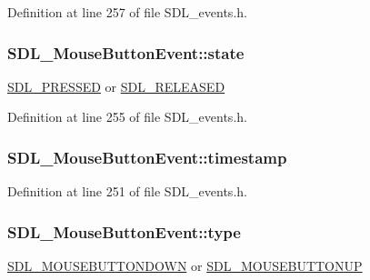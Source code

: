 Definition at line 257 of file S\-D\-L\-\_\-events.\-h.

\hypertarget{struct_s_d_l___mouse_button_event_a8809cef85cfffad4f2059f2ba4fc6a3d}{
\subsubsection[{state}]{ S\-D\-L\-\_\-\-Mouse\-Button\-Event\-::state}}\label{struct_s_d_l___mouse_button_event_a8809cef85cfffad4f2059f2ba4fc6a3d}
\hyperlink{_s_d_l__events_8h_aee81bbffbc8489bdea8fecd1232c4bd1}{S\-D\-L\-\_\-\-P\-R\-E\-S\-S\-E\-D} or \hyperlink{_s_d_l__events_8h_ad680a069f9fcab80de91b3eefdf29c3c}{S\-D\-L\-\_\-\-R\-E\-L\-E\-A\-S\-E\-D} 

Definition at line 255 of file S\-D\-L\-\_\-events.\-h.

\hypertarget{struct_s_d_l___mouse_button_event_ab05e8a454692608ff56c502e95799c56}{
\subsubsection[{timestamp}]{ S\-D\-L\-\_\-\-Mouse\-Button\-Event\-::timestamp}}\label{struct_s_d_l___mouse_button_event_ab05e8a454692608ff56c502e95799c56}


Definition at line 251 of file S\-D\-L\-\_\-events.\-h.

\hypertarget{struct_s_d_l___mouse_button_event_af64cb09ea68b8081ecc8ee498552e3d7}{
\subsubsection[{type}]{ S\-D\-L\-\_\-\-Mouse\-Button\-Event\-::type}}\label{struct_s_d_l___mouse_button_event_af64cb09ea68b8081ecc8ee498552e3d7}
\hyperlink{_s_d_l__events_8h_a3b589e89be6b35c02e0dd34a55f3fccaa9267166e1536dfa8b0daa98c0afa9052}{S\-D\-L\-\_\-\-M\-O\-U\-S\-E\-B\-U\-T\-T\-O\-N\-D\-O\-W\-N} or \hyperlink{_s_d_l__events_8h_a3b589e89be6b35c02e0dd34a55f3fccaa4ab85278398d29b9e50f500aad2b952b}{S\-D\-L\-\_\-\-M\-O\-U\-S\-E\-B\-U\-T\-T\-O\-N\-U\-P} 


